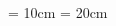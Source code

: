 \documentclass[twoside]{report}
\begin{document}
\pdfpageheight = 10cm
\pdfpagewidth = 20cm

\begin{figure}
	\begin{rotate}{5}
		\textcolor{DarkBlue}{\large\lipsum[1]}
	\end{rotate}
\end{figure}

\newpage
\begin{landscape}
\lipsum[5]
\end{landscape}
\newpage
\layout{}
\end{document}
